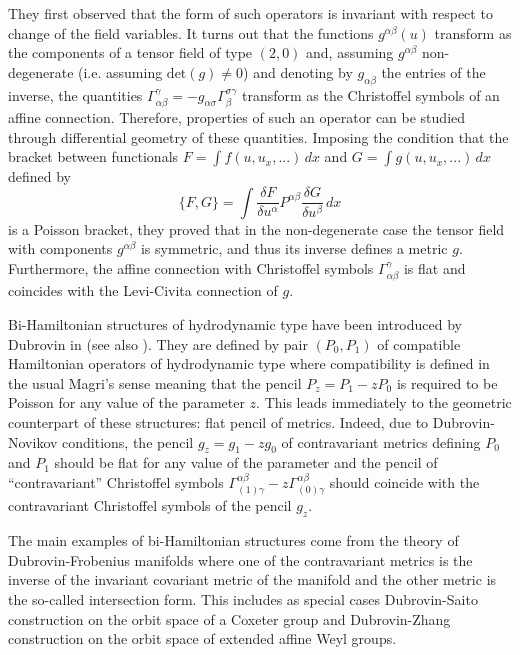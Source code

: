 \documentclass[11pt,a4paper]{amsart}
\numberwithin{equation}{section}
\newcommand{\qa}{\alpha}
\newcommand{\qb}{\beta}
\newcommand{\qg}{\gamma}
\newcommand{\qs}{\sigma}
\numberwithin{equation}{section}
\begin{document}
They first observed that the form of such operators is invariant with respect to  change of the field variables. It turns out that the functions $g^{\qa\qb}(u)$ transform as the components of a tensor field of type $(2,0)$ and, assuming $g^{\qa\qb}$  non-degenerate (i.e. assuming $\text{det}(g)\ne 0$) and denoting by $g_{\qa\qb}$ the entries of the inverse, the quantities $\Gamma^{\qg}_{\qa\qb}=-g_{\qa\qs}\Gamma^{\qs\qg}_{\qb}$ transform as the Christoffel symbols of an affine connection. Therefore, properties of such an operator can be studied through differential geometry of these quantities. Imposing the condition
 that the bracket between functionals $F=\int f(u,u_x,...)\,dx$ and $G=\int g(u,u_x,...)\,dx$ defined by
 \begin{equation}
 \{F,G\}=\int\frac{\delta F}{\delta u^\qa}P^{\qa\qb}\frac{\delta G}{\delta u^\qb}\,dx
 \end{equation}
 is a Poisson bracket, they proved that in the non-degenerate case  the tensor field with components $g^{\qa\qb}$ is symmetric, and thus its inverse defines a metric $g$. Furthermore, the affine connection with Christoffel symbols  $\Gamma^{\qg}_{\qa\qb}$ is flat and coincides with the Levi-Civita connection of $g$.

 Bi-Hamiltonian structures of hydrodynamic type have been introduced by Dubrovin in \cite{du93} (see also \cite{du97}). They are defined by pair $(P_0,P_1)$ of compatible Hamiltonian operators of  hydrodynamic type where compatibility is defined in the usual Magri's sense  meaning that the pencil $P_{z}=P_1-z P_0$ is required to be Poisson for any value of the
 parameter $z$. This leads immediately to the geometric counterpart of these structures: flat pencil of metrics. Indeed, due to Dubrovin-Novikov conditions, the pencil $g_{z}=g_1-z g_0$ of contravariant metrics defining $P_0$ and $P_1$ should be flat for any value of the parameter and the pencil of ``contravariant'' Christoffel symbols $\Gamma^{\qa\qb}_{(1)\qg}-z\Gamma^{\qa\qb}_{(0)\qg}$ should coincide with the contravariant Christoffel symbols of the pencil $g_{z}$.

The main examples of bi-Hamiltonian structures come from the theory of Dubrovin-Frobenius manifolds where one of the contravariant metrics is the inverse of the invariant covariant metric of the manifold and the other metric is the so-called intersection form. This includes as special cases Dubrovin-Saito construction on the orbit space of a Coxeter group \cite{saito,SYS,du93,du96} and Dubrovin-Zhang construction \cite{DZ98} on the orbit space of extended affine Weyl groups.
 
\end{document}
